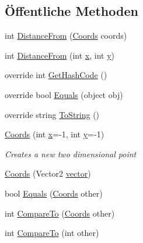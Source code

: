 \subsection*{Öffentliche Methoden}
\begin{DoxyCompactItemize}
\item 
int \hyperlink{class_gruppe22_1_1_backend_1_1_coords_af1e05666f06a514626fb624381b20188}{Distance\-From} (\hyperlink{class_gruppe22_1_1_backend_1_1_coords}{Coords} coords)
\item 
int \hyperlink{class_gruppe22_1_1_backend_1_1_coords_a80e44f8ce720c800294ea7767c8ad2d4}{Distance\-From} (int \hyperlink{class_gruppe22_1_1_backend_1_1_coords_a5d6a2857d47b7fb03ff0fa9c07a41d11}{x}, int \hyperlink{class_gruppe22_1_1_backend_1_1_coords_a941b0ec77fa0973cc2faf35f9a6d85dd}{y})
\item 
override int \hyperlink{class_gruppe22_1_1_backend_1_1_coords_a330a4754be4e5d50c2efa07d046a2b9b}{Get\-Hash\-Code} ()
\item 
override bool \hyperlink{class_gruppe22_1_1_backend_1_1_coords_a294cf31d438e861ef2e2d9d3d6068b4f}{Equals} (object obj)
\item 
override string \hyperlink{class_gruppe22_1_1_backend_1_1_coords_a25e055e9bf0d25318f30b3611cdee050}{To\-String} ()
\item 
\hyperlink{class_gruppe22_1_1_backend_1_1_coords_a5f2dabc4615c0de75c0e50ca709df6bc}{Coords} (int \hyperlink{class_gruppe22_1_1_backend_1_1_coords_a5d6a2857d47b7fb03ff0fa9c07a41d11}{x}=-\/1, int \hyperlink{class_gruppe22_1_1_backend_1_1_coords_a941b0ec77fa0973cc2faf35f9a6d85dd}{y}=-\/1)
\begin{DoxyCompactList}\small\item\em Creates a new two dimensional point \end{DoxyCompactList}\item 
\hyperlink{class_gruppe22_1_1_backend_1_1_coords_a4f39203cb05943723de094a3ec8bd29d}{Coords} (Vector2 \hyperlink{class_gruppe22_1_1_backend_1_1_coords_a44af20a66f196320d537beed94622ce4}{vector})
\item 
bool \hyperlink{class_gruppe22_1_1_backend_1_1_coords_ad5aae2d517c9e3916da5f2d6874737dc}{Equals} (\hyperlink{class_gruppe22_1_1_backend_1_1_coords}{Coords} other)
\item 
int \hyperlink{class_gruppe22_1_1_backend_1_1_coords_ad09860f971ff478900daeb4337dbec6f}{Compare\-To} (\hyperlink{class_gruppe22_1_1_backend_1_1_coords}{Coords} other)
\item 
int \hyperlink{class_gruppe22_1_1_backend_1_1_coords_a9cb8c0ad330e5d405c7037f163fa122f}{Compare\-To} (int other)
\end{DoxyCompactItemize}
